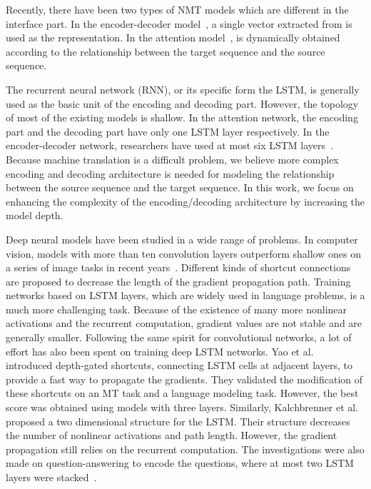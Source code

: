 \documentclass[11pt,letterpaper]{article}
\newcommand{\change}[1]{}
\begin{document}
Recently, there have been two types of NMT models which are  \mbox{different} in the interface part. In the encoder-decoder
model~\cite{Sutskever-Le-NIPS2014},  a single vector extracted from  is used as the representation. In the attention
model~\cite{Bahdanau-Bengio-ICLR2015},  is dynamically obtained according to the relationship between the target sequence and
the source sequence.

The recurrent neural network (RNN), or its specific form the LSTM, is generally used as the basic
\mbox{unit} of the encoding and decoding part. However, the topology of most of the existing models is shallow. In the
attention network, the encoding part and the decoding part have only one LSTM layer respectively.  In the
encoder-decoder network, researchers have used at most six LSTM layers~\cite{Luong-Zaremba-ACL2015}. Because machine
translation is a  difficult problem, we believe more complex encoding and decoding architecture  is needed for modeling the relationship
between the source sequence and the target sequence. In this work, we focus on enhancing the complexity of the encoding/decoding architecture
by increasing the model depth.


Deep neural models have been studied in a wide range of problems. In computer vision, models with more than ten\change{was:tens "more than
tens" would mean at least a hundred} convolution layers outperform  shallow ones on a series of image tasks in \mbox{recent}
years~\cite{Srivastava-Schmidhuber-Arxiv2015,He-Sun-ARXIV2015,Szegedy-Rabinovich-CVPR2015}. Different kinds of shortcut connections are
proposed to decrease the length of the gradient propagation path. Training networks based on \mbox{LSTM} layers, which
are widely used in language problems, is a much more challenging task. Because of  the existence of
many more nonlinear activations and the recurrent computation, gradient values are not stable and are generally
smaller. Following the same spirit for convolutional networks, a lot of effort has also been spent
on training deep LSTM networks.  Yao et al.~ introduced depth-gated shortcuts,
connecting LSTM cells at adjacent layers, to provide a fast way to propagate the gradients. They validated the modification
of these shortcuts on an MT task and a language modeling task. However, the best \mbox{score} was obtained
using models with three layers. Similarly, Kalchbrenner et al.~ proposed a two dimensional
structure for the LSTM. Their structure decreases the number of nonlinear activations and path length. However, the gradient
propagation still relies on the recurrent computation. The investigations were also made on question-answering to encode the questions, where
at most \mbox{two} LSTM layers were stacked~\cite{Hermann-Blunsom-Arxiv2015}.
\end{document}
